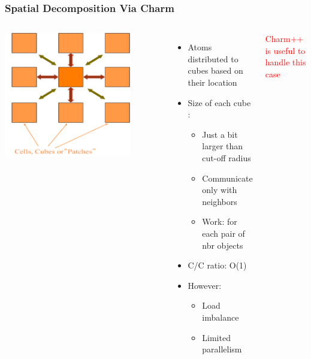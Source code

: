 \begin{frame}[t]
\begin{columns}
  \vfill
  \end{columns}
\end{frame}

\begin{frame}[t]
\frametitle{Spatial Decomposition Via Charm}
  \begin{columns}
  \begin{center} \includegraphics[width=0.8\textwidth]{figures/namd_decomp.pdf} \end{center}
  \begin{itemize}
    \item Atoms distributed to cubes based on their location
    \pause
    \item Size of each cube :
    \begin{itemize}
      \item Just a bit larger than cut-off radius
      \item Communicate only with neighbors
      \item Work: for each pair of nbr objects
    \end{itemize}
    \item C/C ratio: O(1)
    \pause
    \item However: 
    \begin{itemize}
      \item Load imbalance
      \item Limited parallelism
    \end{itemize}
  \end{itemize}
  \pause
  \textcolor{red}{Charm++ is useful to handle this case}
  \end{columns}
\end{frame}

